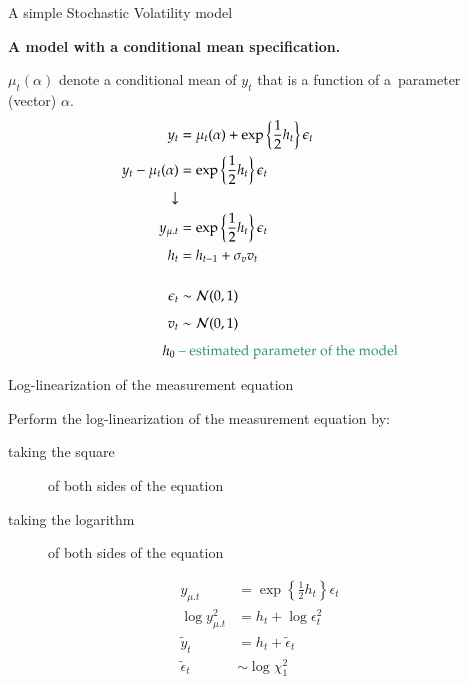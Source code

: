 \documentclass[notes,blackandwhite,mathsans,usenames,dvipsnames]{beamer}
\begin{document}
\begin{frame}{A simple Stochastic Volatility model}

\bigskip\textbf{A model with a conditional mean specification.}

 $\mu_t(\alpha)$ {\color{mcxs2}denote a conditional mean of} $y_t$ {\color{mcxs2}that is a function of a~parameter (vector)} $\alpha$.
\begin{align*}
y_t &= \mu_t(\alpha) + \exp\left\{\frac{1}{2}h_t\right\} \epsilon_t\\
y_t - \mu_t(\alpha) &= \exp\left\{\frac{1}{2}h_t\right\} \epsilon_t\\
\downarrow&\\
y_{\mu.t} &= \exp\left\{\frac{1}{2}h_t\right\} \epsilon_t\\
h_t &= h_{t-1} + \sigma_v v_t\\[3ex]
\epsilon_t &\sim\mathcal{N}(0,1)\\[1ex]
v_t &\sim\mathcal{N}(0,1)\\[1ex]
h_0 \text{ } & \text{\color{mcxs2}-- estimated parameter of the model}
\end{align*}

\end{frame}



\begin{frame}{Log-linearization of the measurement equation}

{\color{mcxs2}Perform the log-linearization of the measurement equation by:}
\begin{description}
\item[taking the square] {\color{mcxs2}of both sides of the equation}
\item[taking the logarithm] {\color{mcxs2}of both sides of the equation}
\end{description}
\begin{align*}
y_{\mu.t} &= \exp\left\{\frac{1}{2}h_t\right\} \epsilon_t \\[1ex]
\log y_{\mu.t}^2 &= h_t + \log\epsilon_t^2 \\[2ex]
\tilde{y}_{t} &= h_t + \tilde{\epsilon}_t \\[2ex]
\tilde{\epsilon}_t &\sim \log\chi^2_1	
\end{align*}

\end{frame}
\end{document}
